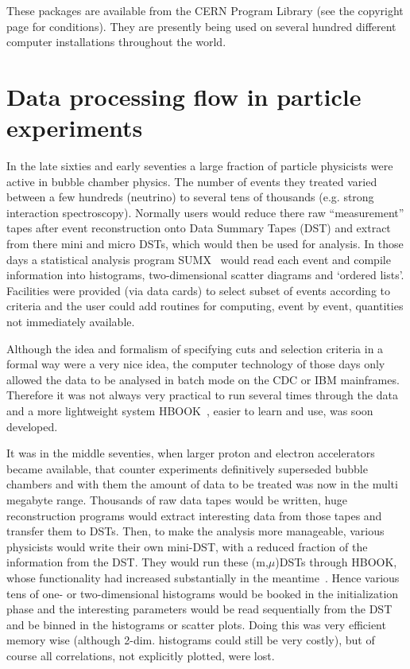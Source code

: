 These packages are available from the CERN Program Library 
(see the copyright page for conditions).
They are presently being used on several hundred different computer
installations throughout the world.

\section{Data processing flow in particle experiments}
\label{HDATPROC}

In the late sixties and early seventies a large fraction of particle 
physicists were active in bubble chamber physics.
The number of events they treated varied between a few hundreds (neutrino) 
to several tens of thousands (e.g. strong interaction spectroscopy). 
Normally users would reduce there raw ``measurement'' tapes
after event reconstruction onto Data Summary Tapes (DST) and extract from
there mini and micro DSTs, which would then be used for analysis.
In those days a statistical analysis program SUMX~\cite{bib-SUMX}
would read each event and compile information into histograms,
two-dimensional scatter diagrams and `ordered lists'. Facilities were
provided (via data cards) to select subset of events according
to criteria and the user could add routines for computing, event by
event, quantities not immediately available.

Although the idea and formalism of specifying cuts and
selection criteria in a formal way were a very nice idea,
the computer technology of those days only allowed the data to be analysed
in batch mode on the CDC or IBM mainframes.
Therefore it was not always very practical to run several times
through the data and a more lightweight system 
HBOOK~\cite{bib-HBOOK1,bib-HBOOK2},
easier to learn and use, was soon developed.

It was in the middle seventies, when larger proton and electron
accelerators became available, that counter experiments 
definitively superseded bubble chambers and with them the amount of data
to be treated was now in the multi megabyte range. Thousands of
raw data tapes would be written, huge reconstruction programs would
extract interesting data from those tapes and transfer them to 
DSTs. Then, to make the analysis more manageable, various physicists
would write their own mini-DST, with a reduced fraction of the
information from the DST. They would run these (m,$\mu$)DSTs through
HBOOK, whose functionality had increased substantially
in the meantime~\cite{bib-HBOOK3,bib-HBOOK3R}.
Hence various tens of one- or two-dimensional histograms
would be booked in the initialization phase and the interesting
parameters would be read sequentially from the DST and
be binned in the histograms or scatter plots. 
Doing this was very efficient memory wise (although 2-dim.
histograms could still be very costly), but of course all correlations,
not explicitly plotted, were lost.

